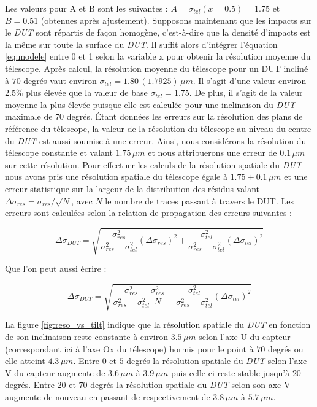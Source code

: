   Les valeurs pour A et B sont les suivantes : $A =\sigma_{tel}(x=0.5) = 1.75$ et $B = 0.51$ (obtenues apr\`es ajustement). Supposons maintenant que les impacts sur le \textit{DUT} sont r\'epartis de fa\c{c}on homog\`ene, c'est-\`a-dire que la densit\'e d'impacts est la m\^eme sur toute la surface du \textit{DUT}. Il suffit alors d'int\'egrer l'\'equation \ref{eq:modele} entre 0 et 1 selon la variable x pour obtenir la r\'esolution moyenne du t\'elescope. Apr\`es calcul, la r\'esolution moyenne du t\'elescope pour un DUT inclin\'e \`a $70$ degr\'es vaut environ $\sigma_{tel} = 1.80 \, (1.7925)\, \mu m$. Il s'agit d'une valeur environ $2.5\%$ plus \'elev\'ee que la valeur de base $\sigma_{tel} = 1.75$. De plus, il s'agit de la valeur moyenne la plus \'elev\'ee puisque elle est calcul\'ee pour une inclinaison du \textit{DUT} maximale de $70$ degr\'es. \'Etant donn\'ees les erreurs sur la r\'esolution des plans de r\'ef\'erence du t\'elescope, la valeur de la r\'esolution du t\'elescope au niveau du centre du \textit{DUT} est aussi soumise \`a une erreur. Ainsi, nous consid\'erons la r\'esolution du t\'elescope constante et valant $1.75 \, \mu m$ et nous attribuerons une erreur de $0.1 \, \mu m$ sur cette r\'esolution. Pour effectuer les calculs de la r\'esolution spatiale du \textit{DUT} nous avons pris une r\'esolution spatiale du t\'elescope \'egale \`a $1.75 \pm 0.1 \, \mu m$ et une erreur statistique sur la largeur de la distribution des r\'esidus valant $\Delta \sigma_{res} = \sigma_{res}/\sqrt{N}$, avec $N$ le nombre de traces passant \`a travers le DUT. Les erreurs sont calcul\'ees selon la relation de propagation des erreurs suivantes :
   
   \begin{equation}
    \Delta \sigma_{DUT} = \sqrt{ \dfrac{\sigma_{res}^2}{\sigma_{res}^2 - \sigma_{tel}^2} (\Delta \sigma_{res})^2 + \dfrac{\sigma_{tel}^2}{\sigma_{res}^2 - \sigma_{tel}^2} (\Delta \sigma_{tel})^2 }
   \end{equation}
   
   Que l'on peut aussi \'ecrire : 
   
   \begin{equation}
    \Delta \sigma_{DUT} = \sqrt{ \dfrac{\sigma_{res}^2}{\sigma_{res}^2 - \sigma_{tel}^2} \dfrac{\sigma_{res}^2}{N} + \dfrac{\sigma_{tel}^2}{\sigma_{res}^2 - \sigma_{tel}^2} (\Delta \sigma_{tel})^2 }
   \end{equation}
   
   \medskip
   
   La figure \ref{fig:reso_vs_tilt} indique que la r\'esolution spatiale du \textit{DUT} en fonction de son inclinaison reste constante \`a environ $3.5 \, \mu m$ selon l'axe U du capteur (correspondant ici \`a l'axe Ox du t\'elescope) hormis pour le point \`a $70$ degr\'es ou elle atteint $4.3 \, \mu m$. Entre $0$ et $5$ degr\'es la r\'esolution spatiale du \textit{DUT} selon l'axe V du capteur augmente de $3.6 \, \mu m$ \`a $3.9 \, \mu m$ puis celle-ci reste stable jusqu'\`a $20$ degr\'es. Entre $20$ et $70$ degr\'es la r\'esolution spatiale du \textit{DUT} selon son axe V augmente de nouveau en passant de respectivement de $3.8 \, \mu m$ \`a $5.7 \, \mu m$.
   
